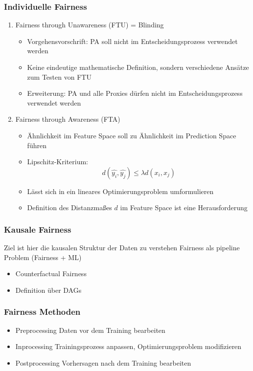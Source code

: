 \documentclass[aspectratio=169]{beamer}
\begin{document}
\begin{frame}
    \frametitle{Individuelle Fairness}
    \begin{enumerate}
        \item Fairness through Unawareness (FTU) = Blinding
        \begin{itemize}
            \item Vorgehensvorschrift: PA soll nicht im Entscheidungsprozess verwendet werden
            \item Keine eindeutige mathematische Definition, sondern verschiedene Ansätze zum Testen von FTU
            \item Erweiterung: PA und alle Proxies dürfen nicht im Entscheidungsprozess verwendet werden
        \end{itemize}
        
        \item Fairness through Awareness (FTA)
        \begin{itemize}
            \item Ähnlichkeit im Feature Space soll zu Ähnlichkeit im Prediction Space führen
            \item Lipschitz-Kriterium:
            \[
            d(\hat{y_i}, \hat{y_j}) \leq \lambda d(x_i, x_j)
            \]
            \item Lässt sich in ein lineares Optimierungsproblem umformulieren
            \item Definition des Distanzmaßes $d$ im Feature Space ist eine Herausforderung
        \end{itemize}
    \end{enumerate}
\end{frame}


\begin{frame}
	\frametitle{Kausale Fairness}
	Ziel ist hier die kausalen Struktur der Daten zu verstehen
	Fairness als pipeline Problem (Fairness + ML)
	\begin{itemize}
		\item Counterfactual Fairness
		\item Definition über DAGs
	\end{itemize}
\end{frame}

\begin{frame}
	\frametitle{Fairness Methoden}
	\begin{itemize}
		\item Preprocessing
		Daten vor dem Training bearbeiten
		\item Inprocessing
		Trainingsprozess anpassen, Optimierungsproblem modifizieren
		\item Postprocessing
		Vorhersagen nach dem Training bearbeiten
	\end{itemize}
\end{frame}
\end{document}

